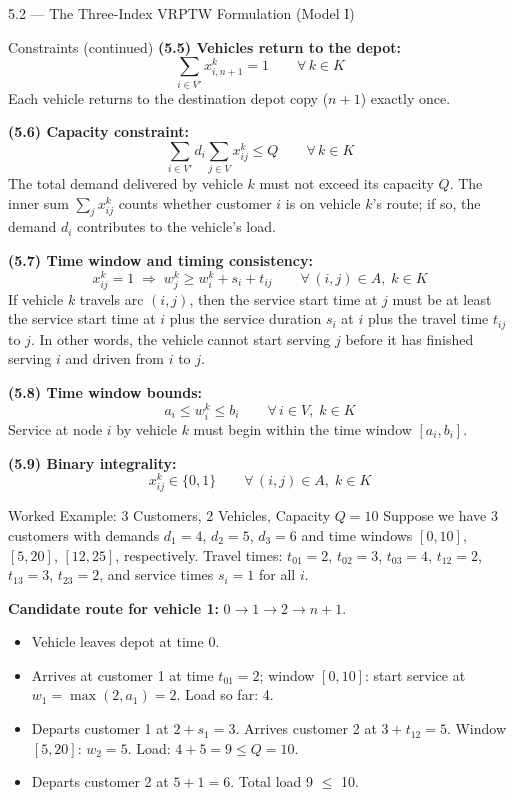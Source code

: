 \documentclass[aspectratio=169,10pt]{beamer}
\begin{document}
\begin{frame}[allowframebreaks]{5.2 --- The Three-Index VRPTW Formulation (Model I)}
\framebreak

\begin{block}{Constraints (continued)}
\textbf{(5.5) Vehicles return to the depot:}
\[
  \sum_{i \in V'} x_{i,n+1}^k = 1
  \qquad \forall\, k \in K
\]
Each vehicle returns to the destination depot copy ($n+1$) exactly once.

\medskip
\textbf{(5.6) Capacity constraint:}
\[
  \sum_{i \in V'} d_i \sum_{j \in V} x_{ij}^k \leq Q
  \qquad \forall\, k \in K
\]
The total demand delivered by vehicle $k$ must not exceed its capacity $Q$.
The inner sum $\sum_{j} x_{ij}^k$ counts whether customer $i$ is on vehicle $k$'s
route; if so, the demand $d_i$ contributes to the vehicle's load.

\medskip
\textbf{(5.7) Time window and timing consistency:}
\[
  x_{ij}^k = 1 \;\Rightarrow\; w_j^k \geq w_i^k + s_i + t_{ij}
  \qquad \forall\, (i,j) \in A,\; k \in K
\]
If vehicle $k$ travels arc $(i,j)$, then the service start time at $j$ must be at
least the service start time at $i$ plus the service duration $s_i$ at $i$ plus the
travel time $t_{ij}$ to $j$.  In other words, the vehicle cannot start serving $j$
before it has finished serving $i$ and driven from $i$ to $j$.

\medskip
\textbf{(5.8) Time window bounds:}
\[
  a_i \leq w_i^k \leq b_i
  \qquad \forall\, i \in V,\; k \in K
\]
Service at node $i$ by vehicle $k$ must begin within the time window $[a_i, b_i]$.

\medskip
\textbf{(5.9) Binary integrality:}
\[
  x_{ij}^k \in \{0, 1\}
  \qquad \forall\, (i,j) \in A,\; k \in K
\]
\end{block}

\framebreak

\begin{exampleblock}{Worked Example: 3 Customers, 2 Vehicles, Capacity $Q=10$}
Suppose we have 3 customers with demands $d_1=4$, $d_2=5$, $d_3=6$ and time windows
$[0,10]$, $[5,20]$, $[12,25]$, respectively.  Travel times: $t_{01}=2$, $t_{02}=3$,
$t_{03}=4$, $t_{12}=2$, $t_{13}=3$, $t_{23}=2$, and service times $s_i=1$ for all $i$.

\textbf{Candidate route for vehicle 1:} $0 \to 1 \to 2 \to n+1$.
\begin{itemize}
  \item Vehicle leaves depot at time 0.
  \item Arrives at customer 1 at time $t_{01}=2$; window $[0,10]$: start service
    at $w_1 = \max(2, a_1) = 2$.  Load so far: 4.
  \item Departs customer 1 at $2 + s_1 = 3$.  Arrives customer 2 at $3 + t_{12} = 5$.
    Window $[5,20]$: $w_2 = 5$.  Load: $4+5=9 \leq Q=10$. \checkmark
  \item Departs customer 2 at $5+1=6$.  Total load 9 $\leq$ 10. \checkmark
\end{itemize}


\end{exampleblock}
\end{frame}
\end{document}
